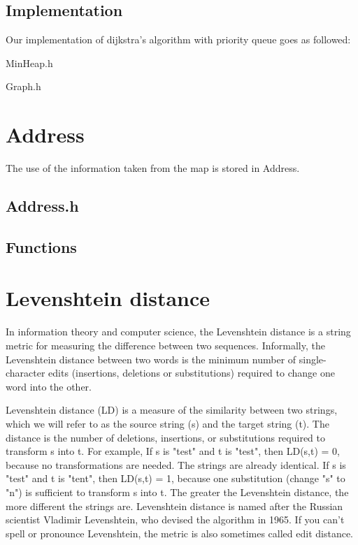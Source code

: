 \documentclass{article}
\begin{document}
\subsection{Implementation}
Our implementation of dijkstra's algorithm with priority queue goes as followed:

MinHeap.h
\begin{framed}

\end{framed}


Graph.h
\begin{framed}

\end{framed}
\newpage

\section{Address}
The use of the information taken from the map is stored in Address.
\subsection{Address.h}
\begin{framed}

\end{framed}

\subsection{Functions}
\begin{framed}

\end{framed}

\newpage
\section{Levenshtein distance}
In information theory and computer science, the Levenshtein distance is a string metric for measuring the difference between two sequences. Informally, the Levenshtein distance between two words is the minimum number of single-character edits (insertions, deletions or substitutions) required to change one word into the other.

Levenshtein distance (LD) is a measure of the similarity between two strings, which we will refer to as the source string (s) and the target string (t). The distance is the number of deletions, insertions, or substitutions required to transform s into t. For example, If s is "test" and t is "test", then LD(s,t) = 0, because no transformations are needed. The strings are already identical. If s is "test" and t is "tent", then LD(s,t) = 1, because one substitution (change "s" to "n") is sufficient to transform s into t.
The greater the Levenshtein distance, the more different the strings are.
Levenshtein distance is named after the Russian scientist Vladimir Levenshtein, who devised the algorithm in 1965. If you can't spell or pronounce Levenshtein, the metric is also sometimes called edit distance.
\end{document}

